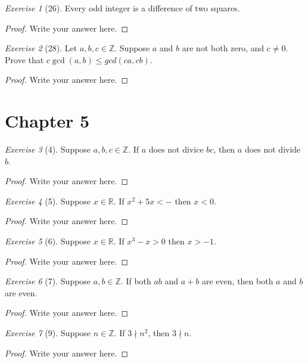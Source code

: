 \documentclass[12pt]{amsart}
\theoremstyle{remark}
\newtheorem*{exercise}{Exercise}%
\def\RR{\ensuremath{\mathbb R}}
\def\ZZ{\ensuremath{\mathbb Z}}
\theoremstyle{mycomment}
\begin{document}
\begin{exercise}[26] Every odd integer is a difference of two squares. 
\begin{proof}
Write your answer here.
\end{proof}
\end{exercise}

\begin{exercise}[28] Let $a,b,c\in\ZZ$. Suppose $a$ and $b$ are not both  zero, and $c\ne 0$. Prove that $c\gcd(a,b)\le gcd(ca,cb)$.
\begin{proof}
Write your answer here.
\end{proof}
\end{exercise}
\section*{Chapter 5}
\begin{exercise}[4] Suppose $a,b,c \in\ZZ$. If $a$ does not divice $bc$, then $a$ does not divide $b$.
\begin{proof}
Write your answer here.
\end{proof}
\end{exercise}

\begin{exercise}[5] Suppose $x\in\RR$. %
If $x^{2}+5x<-$ then $x<0$.
\begin{proof}
Write your answer here.
\end{proof}
\end{exercise}

\begin{exercise}[6] Suppose $x\in\RR$. If $x^{3}-x>0$ then $x>-1$.
\begin{proof}
Write your answer here.
\end{proof}
\end{exercise}

\begin{exercise}[7] Suppose $a,b\in\ZZ$. If both $ab$ and $a+b$ are even, then both $a$ and $b$ are even.
\begin{proof}
Write your answer here.
\end{proof}
\end{exercise}

\begin{exercise}[9] Suppose $n\in\ZZ$. If $3\nmid n^{2}$, then $3\nmid n$. %
\begin{proof}
Write your answer here.
\end{proof}
\end{exercise}
\end{document}
